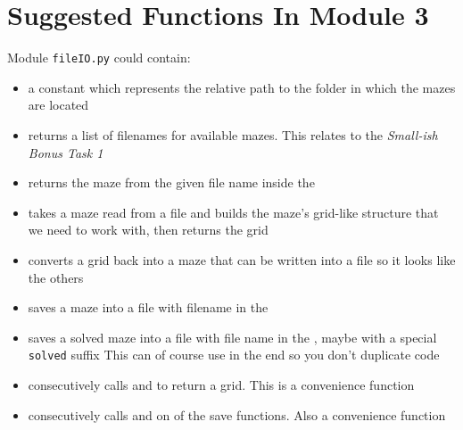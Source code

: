 \section{Suggested Functions In  Module 3}
Module \texttt{fileIO.py} could contain:
\begin{itemize}
    \item {} a constant which represents the relative path to
        the folder in which the mazes are located
    \item {} returns a list of filenames for
        available mazes. This relates to the \emph{Small-ish Bonus Task 1}
    \item {} returns the maze from the given file name
        inside the 
    \item {} takes a maze read from a file and builds
        the maze's grid-like structure that we need to work with, then returns the grid
    \item {} converts a grid back into a maze that
        can be written into a file so it looks like the others
    \item {} saves a maze into a file with filename in
        the 
    \item {} saves a solved maze into a file with
        file name in the , maybe with a special \texttt{solved} suffix
        This can of course use  in the end so you don't duplicate code
    \item {} consecutively calls 
        and  to return a grid. This is a convenience function
    \item {} consecutively calls
         and on of the save functions. Also a convenience function
\end{itemize}
\pagebreak

